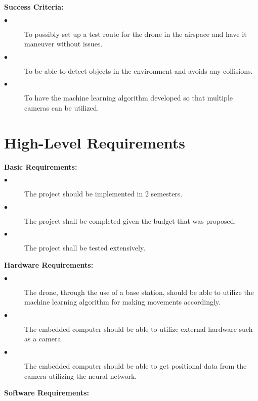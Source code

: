 \documentclass[12pt,onecolumn]{IEEEtran}			%
\begin{document}
 \textbf{Success Criteria:}

 \begin{description}
  \item[$\bullet$ ] To possibly set up a test route for the drone in the airspace and have it maneuver without issues. 
  \item[$\bullet$ ] To be able to detect objects in the environment and avoids any collisions. 
  \item[$\bullet$ ] To have the machine learning algorithm developed so that multiple cameras can be utilized. 
  
\end{description} 
\vspace{12pt} 
 
 \section{High-Level Requirements}

 
\textbf{Basic Requirements:}

 \begin{description}
  \item[$\bullet$ ] The project should be implemented in 2 semesters. 
  \item[$\bullet$ ] The project shall be completed given the budget that was proposed. 
  \item[$\bullet$ ] The project shall be tested extensively. 
  
\end{description} 
\vspace{12pt} 

\textbf{Hardware Requirements:}
 
 \begin{description}
  \item[$\bullet$ ] The drone, through the use of a base station, should be able to utilize the machine learning algorithm for making movements accordingly. 
  \item[$\bullet$ ] The embedded computer should be able to utilize external hardware such as a camera. 
  \item[$\bullet$ ] The embedded computer should be able to get positional data from the camera utilizing the neural network. 
\end{description} 

\vspace{12pt} 

 \textbf{Software Requirements:}
 
\end{document}
